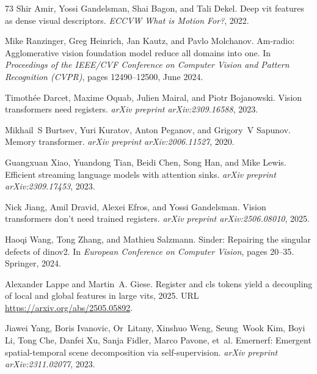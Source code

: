 \documentclass{article}
\begin{document}
\begin{thebibliography}{73}
Shir Amir, Yossi Gandelsman, Shai Bagon, and Tali Dekel.
\newblock Deep vit features as dense visual descriptors.
\newblock \emph{ECCVW What is Motion For?}, 2022.

Mike Ranzinger, Greg Heinrich, Jan Kautz, and Pavlo Molchanov.
\newblock Am-radio: Agglomerative vision foundation model reduce all domains
  into one.
\newblock In \emph{Proceedings of the IEEE/CVF Conference on Computer Vision
  and Pattern Recognition (CVPR)}, pages 12490--12500, June 2024.

Timoth{\'e}e Darcet, Maxime Oquab, Julien Mairal, and Piotr Bojanowski.
\newblock Vision transformers need registers.
\newblock \emph{arXiv preprint arXiv:2309.16588}, 2023.

Mikhail~S Burtsev, Yuri Kuratov, Anton Peganov, and Grigory~V Sapunov.
\newblock Memory transformer.
\newblock \emph{arXiv preprint arXiv:2006.11527}, 2020.

Guangxuan Xiao, Yuandong Tian, Beidi Chen, Song Han, and Mike Lewis.
\newblock Efficient streaming language models with attention sinks.
\newblock \emph{arXiv preprint arXiv:2309.17453}, 2023.

Nick Jiang, Amil Dravid, Alexei Efros, and Yossi Gandelsman.
\newblock Vision transformers don't need trained registers.
\newblock \emph{arXiv preprint arXiv:2506.08010}, 2025.

Haoqi Wang, Tong Zhang, and Mathieu Salzmann.
\newblock Sinder: Repairing the singular defects of dinov2.
\newblock In \emph{European Conference on Computer Vision}, pages 20--35.
  Springer, 2024{}.

Alexander Lappe and Martin~A. Giese.
\newblock Register and cls tokens yield a decoupling of local and global
  features in large vits, 2025.
\newblock URL \url{https://arxiv.org/abs/2505.05892}.

Jiawei Yang, Boris Ivanovic, Or~Litany, Xinshuo Weng, Seung~Wook Kim, Boyi Li,
  Tong Che, Danfei Xu, Sanja Fidler, Marco Pavone, et~al.
\newblock Emernerf: Emergent spatial-temporal scene decomposition via
  self-supervision.
\newblock \emph{arXiv preprint arXiv:2311.02077}, 2023.


\end{thebibliography}
\end{document}
